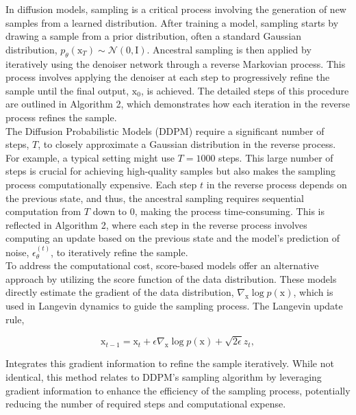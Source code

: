 In diffusion models, sampling is a critical process involving the generation of new samples from a learned distribution. After training a model, sampling starts by drawing a sample from a prior distribution, often a standard Gaussian distribution, $p_{\theta}(\mathrm{x}_{T}) \sim \mathcal{N}(0, \mathrm{I})$. Ancestral sampling is then applied by iteratively using the denoiser network through a reverse Markovian process. This process involves applying the denoiser at each step to progressively refine the sample until the final output, $\mathrm{x}_{0}$, is achieved. The detailed steps of this procedure are outlined in Algorithm 2, which demonstrates how each iteration in the reverse process refines the sample. \\

\noindent The Diffusion Probabilistic Models (DDPM) require a significant number of steps, $T$, to closely approximate a Gaussian distribution in the reverse process. For example, a typical setting might use $T = 1000$ steps. This large number of steps is crucial for achieving high-quality samples but also makes the sampling process computationally expensive. Each step \( t \) in the reverse process depends on the previous state, and thus, the ancestral sampling requires sequential computation from $T$ down to $0$, making the process time-consuming. This is reflected in Algorithm 2, where each step in the reverse process involves computing an update based on the previous state and the model's prediction of noise, $\epsilon_{\theta}^{(t)}$, to iteratively refine the sample. \\

\noindent To address the computational cost, score-based models offer an alternative approach by utilizing the score function of the data distribution. These models directly estimate the gradient of the data distribution, $\nabla_{\mathrm{x}} \log p(\mathrm{x})$, which is used in Langevin dynamics to guide the sampling process. The Langevin update rule,

\begin{equation}
    \mathrm{x}_{t-1} = \mathrm{x}_{t} + \epsilon \nabla_{\mathrm{x}} \log p(\mathrm{x}) + \sqrt{2\epsilon} z_{t},
\end{equation}

\noindent Integrates this gradient information to refine the sample iteratively. While not identical, this method relates to DDPM’s sampling algorithm by leveraging gradient information to enhance the efficiency of the sampling process, potentially reducing the number of required steps and computational expense. \\


